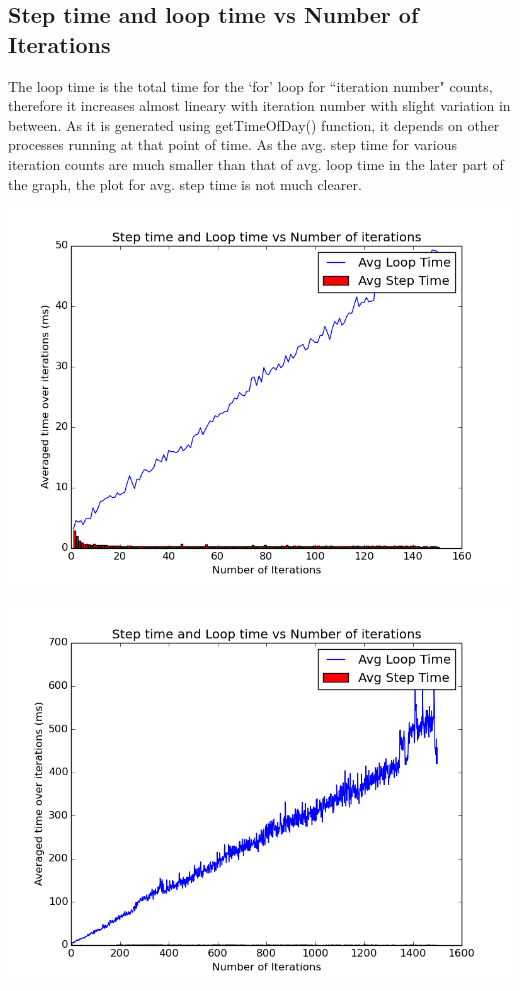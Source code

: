 \documentclass[11pt]{article}
\begin{document}
	\subsection{Step time and loop time vs Number of Iterations} 
	The loop time is the total time for the `for' loop for ``iteration number" counts, therefore it increases almost lineary with iteration number 
	with slight variation in between. As it is generated using getTimeOfDay() function, it depends on other processes running at that point of time.
	As the avg. step time for various iteration counts are much smaller than that of avg. loop time in the later part of the graph, the plot for 
	avg. step time is not much clearer. 	
	\begin{center}
	  \includegraphics[scale=0.5]{images/g26_plot00_150x10_even}
	\end{center}
	\begin{center}
	  \includegraphics[scale=0.5]{images/g26_plot00_1500x10_random}
	\end{center}
\end{document}
